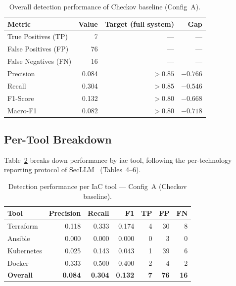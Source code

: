 \documentclass[12pt, a4paper]{report}
\begin{document}
\begin{table}[H]
  \centering
  \caption{Overall detection performance of Checkov baseline (Config~A).}
  \label{tab:overall_detection}
  \begin{tabular}{lrrr}
    \toprule
    \textbf{Metric} & \textbf{Value} & \textbf{Target (full system)} & \textbf{Gap} \\
    \midrule
    True Positives (TP)  & 7  & --- & --- \\
    False Positives (FP) & 76 & --- & --- \\
    False Negatives (FN) & 16 & --- & --- \\
    Precision            & 0.084 & $> 0.85$ & $-0.766$ \\
    Recall               & 0.304 & $> 0.85$ & $-0.546$ \\
    F1-Score             & 0.132 & $> 0.80$ & $-0.668$ \\
    Macro-F1             & 0.082 & $> 0.80$ & $-0.718$ \\
    \bottomrule
  \end{tabular}
\end{table}

\subsection{Per-Tool Breakdown}

Table~\ref{tab:per_tool} breaks down performance by \gls{iac} tool, following the
per-technology reporting protocol of SecLLM~\citep{devito2025secllm} (Tables~4--6).

\begin{table}[H]
  \centering
  \caption{Detection performance per IaC tool --- Config~A (Checkov baseline).}
  \label{tab:per_tool}
  \begin{tabular}{lrrrrrr}
    \toprule
    \textbf{Tool} & \textbf{Precision} & \textbf{Recall} & \textbf{F1}
                  & \textbf{TP} & \textbf{FP} & \textbf{FN} \\
    \midrule
    Terraform  & 0.118 & 0.333 & 0.174 & 4 & 30 & 8 \\
    Ansible    & 0.000 & 0.000 & 0.000 & 0 &  3 & 0 \\
    Kubernetes & 0.025 & 0.143 & 0.043 & 1 & 39 & 6 \\
    Docker     & 0.333 & 0.500 & 0.400 & 2 &  4 & 2 \\
    \midrule
    \textbf{Overall} & \textbf{0.084} & \textbf{0.304} & \textbf{0.132} &
    \textbf{7} & \textbf{76} & \textbf{16} \\
    \bottomrule
  \end{tabular}
\end{table}
\end{document}
